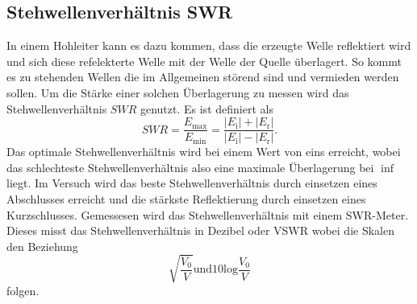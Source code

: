 \subsection{Stehwellenverhältnis SWR}
In einem Hohleiter kann es dazu kommen, dass die erzeugte Welle reflektiert wird und sich diese refelekterte Welle mit der Welle der Quelle überlagert.
So kommt es zu stehenden Wellen die im Allgemeinen störend sind und vermieden werden sollen.
Um die Stärke einer solchen Überlagerung zu messen wird das Stehwellenverhältnis $SWR$ genutzt.
Es ist definiert als 
\begin{equation}
    SWR = \frac{E _\text{max}}{E _\text{min}} = \frac{\left | E _\text{i} \right | + \left | E _\text{r} \right |}{\left | E _\text{i} \right | - \left | E _\text{r} \right |}.
\end{equation}
Das optimale Stehwellenverhältnis wird bei einem Wert von eins erreicht, wobei das schlechteste Stehwellenverhältnis also eine maximale Überlagerung bei $\inf$ liegt.
Im Versuch wird das beste Stehwellenverhältnis durch einsetzen eines Abschlusses erreicht und die stärkste Reflektierung durch einsetzen eines Kurzschlusses.
Gemessesen wird das Stehwellenverhältnis mit einem SWR-Meter.
Dieses misst das Stehwellenverhältnis in Dezibel oder VSWR wobei die Skalen den Beziehung
\begin{equation*}
    \sqrt{\frac{V_0}{V}} \text{und} 10 \text{log} \frac{V_0}{V} 
\end{equation*}
folgen.

